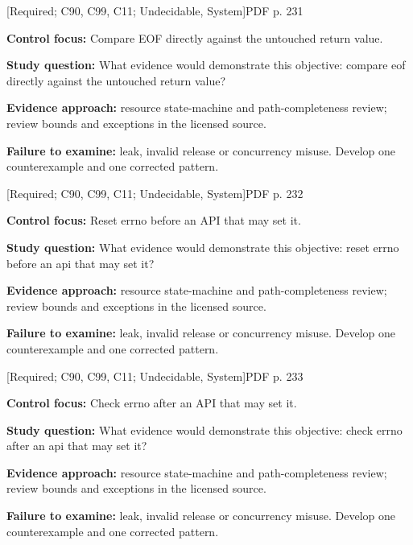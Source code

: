 \documentclass[10pt,letterpaper]{article}
\begin{document}
\smallskip
{}
 \textsf{\footnotesize [Required; C90, C99, C11; Undecidable, System]}\hfill{\footnotesize PDF p. 231}\par
\textbf{Control focus:} Compare EOF directly against the untouched return value.\par
\textbf{Study question:} What evidence would demonstrate this objective: compare eof directly against the untouched return value?\par
\textbf{Evidence approach:} resource state-machine and path-completeness review; review bounds and exceptions in the licensed source.\par
\textbf{Failure to examine:} leak, invalid release or concurrency misuse. Develop one counterexample and one corrected pattern.\par
\smallskip
{}
 \textsf{\footnotesize [Required; C90, C99, C11; Undecidable, System]}\hfill{\footnotesize PDF p. 232}\par
\textbf{Control focus:} Reset errno before an API that may set it.\par
\textbf{Study question:} What evidence would demonstrate this objective: reset errno before an api that may set it?\par
\textbf{Evidence approach:} resource state-machine and path-completeness review; review bounds and exceptions in the licensed source.\par
\textbf{Failure to examine:} leak, invalid release or concurrency misuse. Develop one counterexample and one corrected pattern.\par
\smallskip
{}
 \textsf{\footnotesize [Required; C90, C99, C11; Undecidable, System]}\hfill{\footnotesize PDF p. 233}\par
\textbf{Control focus:} Check errno after an API that may set it.\par
\textbf{Study question:} What evidence would demonstrate this objective: check errno after an api that may set it?\par
\textbf{Evidence approach:} resource state-machine and path-completeness review; review bounds and exceptions in the licensed source.\par
\textbf{Failure to examine:} leak, invalid release or concurrency misuse. Develop one counterexample and one corrected pattern.\par
\smallskip
{}
\end{document}
